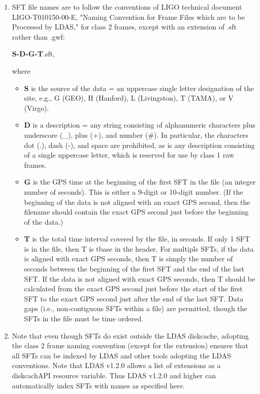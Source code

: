 \documentclass{ligodcc}
\begin{document}
\begin{enumerate}
\item SFT file names are to follow the conventions of LIGO technical
document LIGO-T010150-00-E, "Naming Convention for Frame Files which are
to be Processed by LDAS," for class 2 frames, except with an extension
of .sft rather than .gwf:

{\bf S-D-G-T}.sft,

where
\begin{itemize}
\item {\bf S} is the source of the data = an uppercase single letter designation of
the site, e.g., G (GEO), H (Hanford), L (Livingston), T (TAMA), or V
(Virgo).

\item {\bf D} is a description = any string consisting of alphanumeric characters
plus underscore (\_), plus (+), and number (\#). In particular, the
characters dot (.), dash (-), and space are prohibited, as is any
description consisting of a single uppercase letter, which is reserved
for use by class 1 raw frames.

\item {\bf G} is the GPS time at the beginning of the first SFT in the file (an
integer number of seconds). This is either a 9-digit or 10-digit number.
(If the beginning of the data is not aligned with an exact GPS second,
then the filename should contain the exact GPS second just before the
beginning of the data.)

\item {\bf T} is the total time interval covered by the file, in seconds.  If only 1
SFT is in the file, then T is tbase in the header.  For multiple SFTs,
if the data is aligned with exact GPS seconds, then T is simply the
number of seconds between the beginning of the first SFT and the end of
the last SFT. If the data is not aligned with exact GPS seconds, then T
should be calculated from the exact GPS second just before the start of
the first SFT to the exact GPS second just after the end of the last
SFT. Data gaps (i.e., non-contiguous SFTs within a file) are permitted,
though the SFTs in the file must be time ordered.
\end{itemize}

\item Note that even though SFTs do exist outside the LDAS diskcache,
adopting the class 2 frame naming convention (except for the extension)
ensures that all SFTs can be indexed by LDAS and other tools adopting
the LDAS conventions. Note that LDAS v1.2.0 allows a list of extensions
as a diskcachAPI resource variable. Thus LDAS v1.2.0 and higher can
automatically index SFTs with names as specified here.


\end{enumerate}
\end{document}
